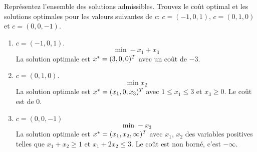 \begin{enumerate}
    Représentez l'ensemble des solutions admissibles. Trouvez le coût optimal et les solutions  optimales pour les
    valeurs suivantes de $c$: $c=(-1, 0, 1)$,
    $c=(0, 1, 0)$ et
    $c=(0, 0, -1)$.

    \begin{solution}
      \begin{enumerate}
        \item $c = (-1,0,1)$.
          $$ \min -x_{1} + x_{3} $$
          La solution optimale est $x^* = (3,0,0)^{T}$
          avec un coût de $-3$.
        \item $c = (0,1,0)$.
          $$ \min x_{2} $$
          La solution optimale est  $x^* = (x_1,0,x_3)^{T}$
          avec $1\le x_1 \le 3$ et $x_3 \geq 0$.
          Le coût est de 0.
        \item $c = (0,0,-1)$
          $$ \min -x_{3} $$
          La solution optimale est $x^* = (x_{1},x_{2},\infty)^{T}$
          avec $x_{1}$, $x_{2}$ des variables positives telles que
          $x_{1} + x_{2} \geq 1$ et $x_{1} + 2x_{2} \le 3$.
          Le coût est non borné, c'est $-\infty$.
      \end{enumerate}
      \begin{center}
      \end{center}
    \end{solution}



\end{enumerate}
